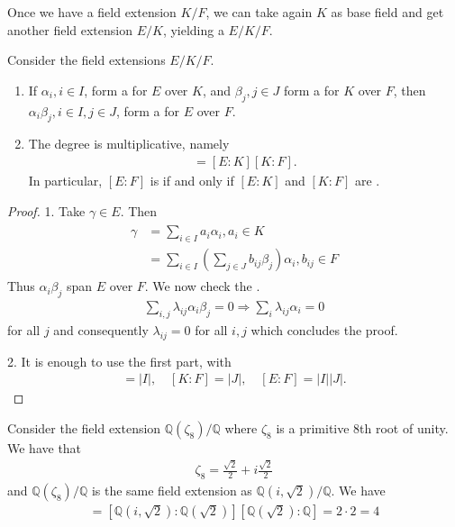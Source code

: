 \documentclass{article}
\begin{document}
Once we have a field extension $K / F$, we can take again $K$ as base field and get another field extension $E / K$, yielding a  $E / K / F$.
\begin{lema}
Consider the field extensions $E / K / F$.
\begin{enumerate}
    \item If $\alpha_{i}, i \in I$, form a  for $E$ over $K$, and $\beta_{j}, j \in J$ form a  for $K$ over $F$, then $\alpha_{i} \beta_{j}, i \in I, j \in J$, form a  for $E$ over $F$.
    \item The degree is multiplicative, namely
\begin{align*}
[E: F]=[E: K][K: F] .
\end{align*}
In particular, $[E: F]$ is  if and only if $[E: K]$ and $[K: F]$ are .
\end{enumerate}
\end{lema}
\begin{proof}
1. Take $\gamma \in E$. Then
\begin{align*}
\begin{aligned}
\gamma &=\sum_{i \in I} a_{i} \alpha_{i}, a_{i} \in K \\
&=\sum_{i \in I}\left(\sum_{j \in J} b_{i j} \beta_{j}\right) \alpha_{i}, b_{i j} \in F
\end{aligned}
\end{align*}
Thus $\alpha_{i} \beta_{j}$ span $E$ over $F$. We now check the .
\begin{align*}
\sum_{i, j} \lambda_{i j} \alpha_{i} \beta_{j}=0 \Rightarrow \sum_{i} \lambda_{i j} \alpha_{i}=0
\end{align*}
for all $j$ and consequently $\lambda_{i j}=0$ for all $i, j$ which concludes the proof.

2. It is enough to use the first part, with
\begin{align*}
[E: K]=|I|, \quad[K: F]=|J|, \quad[E: F]=|I||J| .
\end{align*}

\end{proof}
\begin{exma}
Consider the field extension $\mathbb{Q}\left(\zeta_{8}\right) / \mathbb{Q}$ where $\zeta_{8}$ is a primitive 8th root of unity. We have that
\begin{align*}
\zeta_{8}=\frac{\sqrt{2}}{2}+i \frac{\sqrt{2}}{2}
\end{align*}
and $\mathbb{Q}\left(\zeta_{8}\right) / \mathbb{Q}$ is the same field extension as $\mathbb{Q}(i, \sqrt{2}) / \mathbb{Q}$. We have
\begin{align*}
[\mathbb{Q}(i, \sqrt{2}): \mathbb{Q}]=[\mathbb{Q}(i, \sqrt{2}): \mathbb{Q}(\sqrt{2})][\mathbb{Q}(\sqrt{2}): \mathbb{Q}]=2 \cdot 2=4
\end{align*}
\end{exma}
\end{document}

